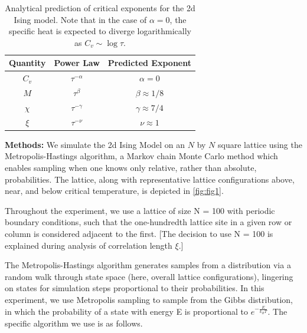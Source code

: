 \documentclass[letter,scriptaddress,twocolumn, prl]{revtex4}
\begin{document}
\begin{table}[h]
	\begin{center}
		\begin{tabular}{|c|c|c|}
			\hline
			Quantity & Power Law & Predicted Exponent \\
			\hline
			$C_v$ & $\tau^{-\alpha}$ & $\alpha = 0$ \\
			$M$ & $\tau^\beta$ & $\beta \approx 1/8$ \\
			$\chi$ & $\tau^{-\gamma}$ & $\gamma \approx 7/4$ \\
			$\xi$ & $\tau^{-\nu}$ & $\nu \approx 1$ \\
			\hline
		\end{tabular}
		\caption{Analytical prediction of critical exponents for the 2d Ising model. Note that in the case of $\alpha = 0$, the specific heat is expected to diverge logarithmically as $C_v \sim \log \tau$.}
		\label{tab:exponents}
	\end{center}
\end{table}

\textbf{Methods:} We simulate the 2d Ising Model on an $N$ by $N$ square lattice using the Metropolis-Hastings algorithm, a Markov chain Monte Carlo method which enables sampling when one knows only relative, rather than absolute, probabilities. The lattice, along with representative lattice configurations above, near, and below critical temperature, is depicted in \autoref{fig:fig1}.

Throughout the experiment, we use a lattice of size N = 100 with periodic boundary conditions, such that the one-hundredth lattice site in a given row or column is considered adjacent to the first. [The decision to use N = 100 is explained during analysis of correlation length $\xi$.]

The Metropolis-Hastings algorithm generates samples from a distribution via a random walk through state space (here, overall lattice configurations), lingering on states for simulation steps proportional to their probabilities. In this experiment, we use Metropolis sampling to sample from the Gibbs distribution, in which the probability of a state with energy E is proportional to $e^{-\frac{E}{k_BT}}$. The specific algorithm we use is as follows.
\end{document}
